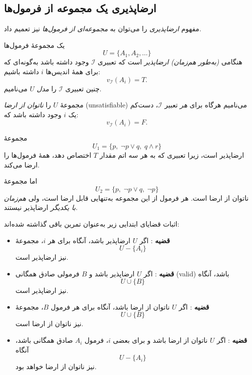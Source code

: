 \subsection*{ ارضاپذیری یک مجموعه از فرمول‌ها}
    مفهوم \emph{ارضاپذیری} را می‌توان به \emph{مجموعه‌ای از فرمول‌ها} نیز تعمیم داد.
    
    \begin{definition}[تعریف \lr{2.42}]
    یک مجموعهٔ فرمول‌ها
    \[
    U = \{A_1, A_2, \dots\}
    \]
    هنگامی \emph{(به‌طور هم‌زمان) ارضاپذیر} است که تعبیری $\mathscr{I}$ وجود داشته باشد به‌گونه‌ای که برای همهٔ اندیس‌ها $i$ داشته باشیم:
    \[
    v_\mathscr{I}(A_i) = T.
    \]
    چنین تعبیری $\mathscr{I}$ را \emph{مدل} $U$ می‌نامیم.
    
    مجموعهٔ $U$ را \emph{ناتوان از ارضا} (unsatisfiable) می‌نامیم هرگاه برای \emph{هر} تعبیر $\mathscr{I}$، دست‌کم یک $i$ وجود داشته باشد که:
    \[
    v_\mathscr{I}(A_i) = F.
    \]
    \end{definition}
    
    \begin{example}[مثال \lr{2.43}]
    مجموعهٔ
    \[
    U_1 = \{p,\; \neg p \lor q,\; q \land r\}
    \]
    ارضاپذیر است، زیرا تعبیری که به هر سه اتم مقدار $T$ اختصاص دهد، همهٔ فرمول‌ها را ارضا می‌کند.
    
    اما مجموعهٔ
    \[
    U_2 = \{p,\; \neg p \lor q,\; \neg p\}
    \]
    ناتوان از ارضا است. هر فرمول از این مجموعه به‌تنهایی قابل ارضا است، ولی \emph{هم‌زمان با یکدیگر} ارضاپذیر نیستند.
    \end{example}
    
    اثبات قضایای ابتدایی زیر به‌عنوان تمرین باقی گذاشته شده‌اند:
    
    \begin{itemize}
      \item \textbf{قضیه }: اگر $U$ ارضاپذیر باشد، آنگاه برای هر $i$، مجموعهٔ
      \[
      U - \{A_i\}
      \]
      نیز ارضاپذیر است.
    
      \item \textbf{قضیه }: اگر $U$ ارضاپذیر باشد و $B$ فرمولی صادق همگانی (valid) باشد، آنگاه
      \[
      U \cup \{B\}
      \]
      نیز ارضاپذیر است.
    
      \item \textbf{قضیه }: اگر $U$ ناتوان از ارضا باشد، آنگاه برای هر فرمول $B$، مجموعهٔ
      \[
      U \cup \{B\}
      \]
      نیز ناتوان از ارضا است.
    
      \item \textbf{قضیه }: اگر $U$ ناتوان از ارضا باشد و برای بعضی $i$، فرمول $A_i$ صادق همگانی باشد، آنگاه
      \[
      U - \{A_i\}
      \]
      نیز ناتوان از ارضا خواهد بود.
    \end{itemize}